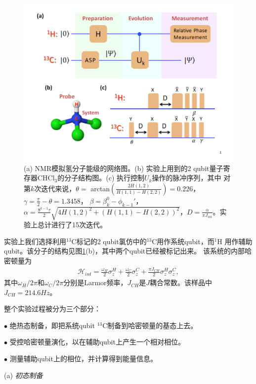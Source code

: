 \begin{figure}[htbp]
            \begin{center}
              \includegraphics[width= 0.8\columnwidth]{figures/nmrhydronet.pdf}
              \caption{(a) NMR模拟氢分子能级的网络图。(b) 实验上用到的2 qubit量子寄存器CHCl$_3$的分子结构图。(c) 执行控制$U_k$操作的脉冲序列，其中
              对第$k$次迭代来说，$\theta =$ arctan$(\frac{2H(1,2)}{H(1,1)-H(2,2)})=0.226$， $\gamma = \frac{\pi}{2}-\theta=1.3458$， $\beta = \beta_k^0-\phi_{k-1}'$，$\alpha = \frac{8^{k-1}\tau}{2}\sqrt{4H(1,2)^2+(H(1,1)-H(2,2))^2}$，$D=\frac{\alpha}{\pi J_{wa}}$。实验上总计进行了15次迭代。}\label{nmrhydronet}
            \end{center}
 \end{figure}

实验上我们选择利用$^{13}$C标记的2 qubit氯仿中的$^{13}$C用作系统qubit，而$^{1}$H
用作辅助qubit。该分子的结构见图\ref{nmrhydronet}(b)，其中两个qubit已经被标记出来。
该系统的内部哈密顿量为
\begin{eqnarray}
\mathcal{H}_{int}=\frac{\omega_{H}}{2}\sigma_{z}^H+\frac{\omega_{C}}{2}\sigma_{z}^{C}+\frac{\pi
J_{CH}}{2}\sigma_{z}^{H}\sigma_{z}^{C},
\end{eqnarray}
其中$\omega_{H}/2\pi$和$\omega_{C}/2\pi$分别是Larmor频率，$J_{CH}$是$J$耦合常数。该样品中$J_{CH}=214.6Hz$。

整个实验过程被分为三个部分：

$\bullet$ 绝热态制备，即把系统qubit $^{13}$C制备到哈密顿量的基态上去。

$\bullet$ 受控哈密顿量演化，以在辅助qubit上产生一个相对相位。

$\bullet$ 测量辅助qubit上的相位，并计算得到能量信息。

(a) \emph{初态制备}

